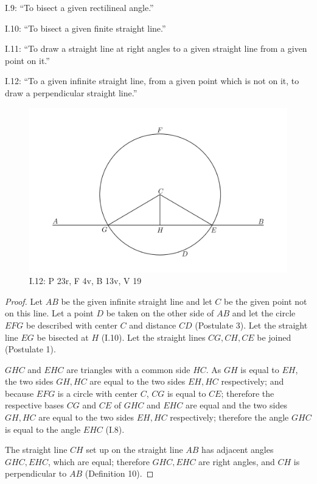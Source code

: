 \documentclass{article}
\begin{document}
I.9: ``To bisect a given rectilineal angle.''

I.10: ``To bisect a given finite straight line.''

I.11: ``To draw a straight line at right angles to a given straight
line from a given point on it.''

I.12: ``To a given infinite straight line, from a given point
which is not on it, to draw a perpendicular straight line.''


\begin{figure}
\begin{center}
\includegraphics[width=\textwidth]{I12.png}
\end{center}
\caption{I.12: P 23r, F 4v, B 13v, V 19}
\label{I12}
\end{figure}


\begin{proof}
Let $AB$ be the given infinite straight line and let $C$ be the given point not on this line.
Let a point $D$ be taken on the other side of $AB$ and let the circle $EFG$ be described with center $C$ and
distance $CD$ (Postulate 3).
Let the straight line $EG$ be bisected at $H$ (I.10).
Let the straight lines $CG, CH, CE$ be joined (Postulate 1).

$GHC$ and $EHC$ are triangles with a common side $HC$. 
As $GH$ is equal to $EH$, the two sides $GH,HC$ are equal to the two sides
$EH,HC$ respectively;
and because $EFG$ is a circle with center $C$,
$CG$ is equal to $CE$;
therefore the respective bases $CG$ and $CE$ of $GHC$ and $EHC$ are equal and the two
sides $GH,HC$ are equal to the two sides $EH,HC$ respectively;
therefore the angle $GHC$ is equal to the angle $EHC$ (I.8).

The straight line $CH$ set up on the straight line $AB$ has adjacent angles $GHC,EHC$, which are equal; therefore
$GHC,EHC$ are right angles, and $CH$ is perpendicular to $AB$ (Definition 10).
\end{proof}
\end{document}
